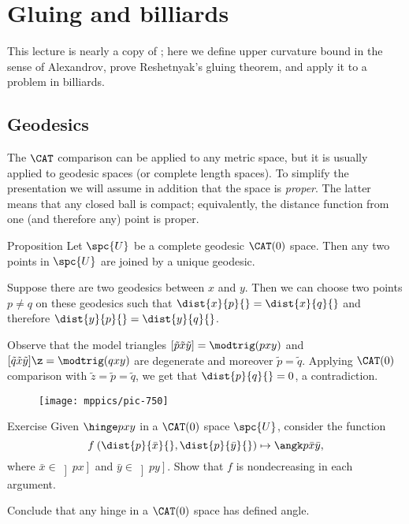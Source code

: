 \chapter{Gluing and billiards}

This lecture is nearly a copy of \cite[Chapter 2]{alexander-kapovitch-petrunin-2019};
here we define upper curvature bound in the sense of Alexandrov, 
prove Reshetnyak's gluing theorem,
and apply it to a problem in billiards.

\section{Geodesics}

The $\CAT$ comparison can be applied to any metric space,
but it is usually applied to geodesic spaces (or complete length spaces).
To simplify the presentation we will assume in addition that the space is \emph{proper}.
The latter means that any closed ball is compact;
equivalently, the distance function from one (and therefore any) point is proper. 

\begin{thm}{Proposition}\label{ex:CAT-geodesic}
Let $\spc{U}$ be a complete geodesic $\CAT(0)$ space.
Then any two points in $\spc{U}$ are joined by a unique geodesic.
\end{thm}

Suppose there are two geodesics between $x$ and $y$.
Then we can choose two points $p\ne q$ on these geodesics such that $\dist{x}{p}{}=\dist{x}{q}{}$ and therefore $\dist{y}{p}{}=\dist{y}{q}{}$.

Observe that the model triangles $[\tilde p\tilde x\tilde y]=\modtrig(pxy)$ and $[\tilde q\tilde x\tilde y]\z=\modtrig(qxy)$ are degenerate and moreover $\tilde p=\tilde q$.
Applying $\CAT(0)$ comparison with $\tilde z=\tilde p=\tilde q$,
we get that $\dist{p}{q}{}=0$, a contradiction.
\qeds

\begin{wrapfigure}{r}{25mm}
\vskip-0mm
\centering
\texttt{[image: mppics/pic-750]}
\end{wrapfigure}

\begin{thm}{Exercise}\label{ex:noncreasing-CAT}
Given $\hinge p x y$ in a $\CAT(0)$ space $\spc{U}$, consider the function 
\[f\:(\dist{p}{\bar x}{},\dist{p}{\bar y}{})\mapsto \angk p{\bar x}{\bar y},\]
where $\bar x\in\left]p x\right]$ and $\bar y\in\left]p y\right]$.
Show that $f$ is nondecreasing in each argument.

Conclude that any hinge in a $\CAT(0)$ space has defined angle.
\end{thm}

